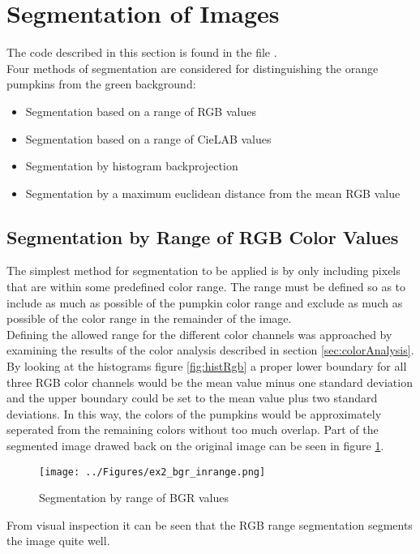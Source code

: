 \documentclass[../Head/Main.tex]{subfiles}
\begin{document}
\section{Segmentation of Images}
The code described in this section is found in the file .\\
Four methods of segmentation are considered for distinguishing the orange pumpkins from the green background:
\begin{itemize}
\item Segmentation based on a range of RGB values
\item Segmentation based on a range of CieLAB values
\item Segmentation by histogram backprojection
\item Segmentation by a maximum euclidean distance from the mean RGB value
\end{itemize}

\subsection{Segmentation by Range of RGB Color Values}
The simplest method for segmentation to be applied is by only including pixels that are within some predefined color range. The range must be defined so as to include as much as possible of the pumpkin color range and exclude as much as possible of the color range in the remainder of the image.\\
Defining the allowed range for the different color channels was approached by examining the results of the color analysis described in section \ref{sec:colorAnalysis}. By looking at the histograms figure \ref{fig:histRgb} a proper lower boundary for all three RGB color channels would be the mean value minus one standard deviation and the upper boundary could be set to the mean value plus two standard deviations. In this way, the colors of the pumpkins would be approximately seperated from the remaining colors without too much overlap. Part of the segmented image drawed back on the original image can be seen in figure \ref{fig:bgrSeg}.

\begin{figure}[H]
\centering
\texttt{[image: ../Figures/ex2\_bgr\_inrange.png]}
\caption{Segmentation by range of BGR values}
\label{fig:bgrSeg}
\end{figure}

From visual inspection it can be seen that the RGB range segmentation segments the image quite well. 
\end{document}
